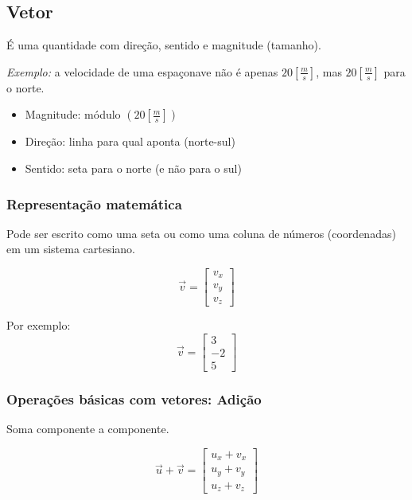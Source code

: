 
\subsection{Vetor}

É uma quantidade com direção, sentido e magnitude (tamanho).

\emph{Exemplo:}
a velocidade de uma espaçonave não é apenas $20 [\frac{m}{s}]$, mas $20 [\frac{m}{s}]$ para o norte.

\begin{itemize}
    \item Magnitude: módulo $(20 [\frac{m}{s}])$
    \item Direção: linha para qual aponta (norte-sul)
    \item Sentido: seta para o norte (e não para o sul)
\end{itemize}

\subsubsection{Representação matemática}
Pode ser escrito como uma seta ou como uma coluna de números (coordenadas) em um sistema cartesiano.

\begin{equation}
\label{eq:representacao_vetor1}
    \vec v =
    \begin{bmatrix}
    v_x \\ v_y \\ v_z
    \end{bmatrix}
\end{equation}

Por exemplo:
\begin{equation}
\label{eq:exemplo_vetor1}
    \vec v =
    \begin{bmatrix}
    3 \\ -2 \\ 5
    \end{bmatrix}
\end{equation}

\subsubsection{Operações básicas com vetores: Adição}
Soma componente a componente.

\begin{equation}
\label{eq:soma_vetores}
    \vec u + \vec v =
    \begin{bmatrix}
    u_x+v_x \\
    u_y+v_y \\
    u_z+v_z
    \end{bmatrix}
\end{equation}

